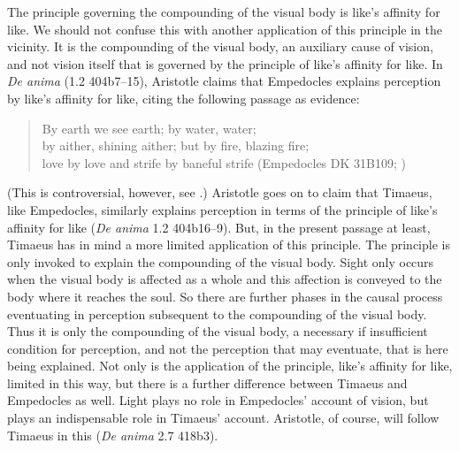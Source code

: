 The principle governing the compounding of the visual body is like's affinity for like. We should not confuse this with another application of this principle in the vicinity. It is the compounding of the visual body, an auxiliary cause of vision, and not vision itself that is governed by the principle of like's affinity for like. In \emph{De anima} (1.2 404b7--15), Aristotle claims that Empedocles explains perception by like's affinity for like, citing the following passage as evidence:
\begin{verse}
	By earth we see earth; by water, water;\\
	by aither, shining aither; but by fire, blazing fire;\\
	love by love and strife by baneful strife (Empedocles DK 31B109; \citealt[221]{Inwood:2001ve})
\end{verse} 
(This is controversial, however, see \citealt{Kamtekar:2009fk}.) Aristotle goes on to claim that Timaeus, like Empedocles, similarly explains perception in terms of the principle of like's affinity for like (\emph{De anima} 1.2 404b16--9). But, in the present passage at least, Timaeus has in mind a more limited application of this principle. The principle is only invoked to explain the compounding of the visual body. Sight only occurs when the visual body is affected as a whole and this affection is conveyed to the body where it reaches the soul. So there are further phases in the causal process eventuating in perception subsequent to the compounding of the visual body. Thus it is only the compounding of the visual body, a necessary if insufficient condition for perception, and not the perception that may eventuate, that is here being explained. Not only is the application of the principle, like's affinity for like, limited in this way, but there is a further difference between Timaeus and Empedocles as well. Light plays no role in Empedocles' account of vision, but plays an indispensable role in Timaeus' account. Aristotle, of course, will follow Timaeus in this (\emph{De anima} 2.7 418b3).

